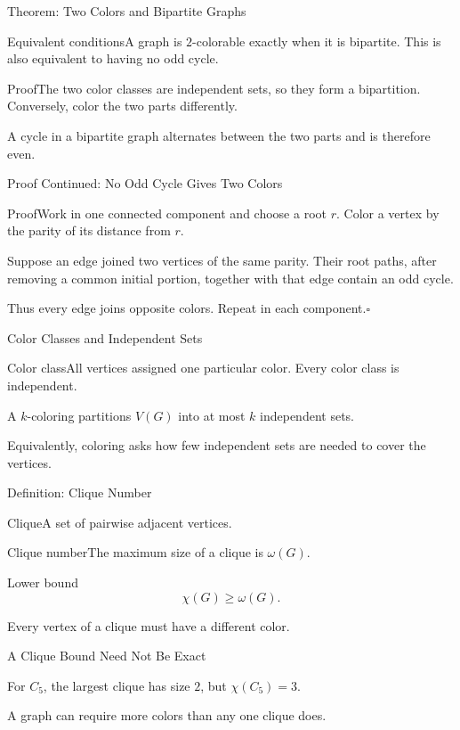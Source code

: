 \documentclass[aspectratio=169,11pt]{beamer}
\newcommand{\Def}[2]{\begin{block}{#1}#2\end{block}}
\newcommand{\Thm}[2]{\begin{block}{#1}#2\end{block}}
\renewcommand{\Proof}[1]{\begin{block}{Proof}\normalsize #1\end{block}}
\newcommand{\gap}{\par\medskip}
\begin{document}
\begin{frame}{Theorem: Two Colors and Bipartite Graphs}
\large
\Thm{Equivalent conditions}{A graph is $2$-colorable exactly when it is bipartite. This is also equivalent to having no odd cycle.}
\Proof{The two color classes are independent sets, so they form a bipartition. Conversely, color the two parts differently.\gap A cycle in a bipartite graph alternates between the two parts and is therefore even.}
\end{frame}
\begin{frame}{Proof Continued: No Odd Cycle Gives Two Colors}
\large
\Proof{Work in one connected component and choose a root $r$. Color a vertex by the parity of its distance from $r$.\gap Suppose an edge joined two vertices of the same parity. Their root paths, after removing a common initial portion, together with that edge contain an odd cycle.\gap Thus every edge joins opposite colors. Repeat in each component.\hfill$\square$}
\end{frame}
\begin{frame}{Color Classes and Independent Sets}
\large
\Def{Color class}{All vertices assigned one particular color. Every color class is independent.}
\gap A $k$-coloring partitions $V(G)$ into at most $k$ independent sets.
\gap Equivalently, coloring asks how few independent sets are needed to cover the vertices.
\end{frame}
\begin{frame}{Definition: Clique Number}
\large
\Def{Clique}{A set of pairwise adjacent vertices.}
\Def{Clique number}{The maximum size of a clique is $\omega(G)$.}
\Thm{Lower bound}{\[\chi(G)\ge\omega(G).\]}
Every vertex of a clique must have a different color.
\end{frame}
\begin{frame}{A Clique Bound Need Not Be Exact}
\large
\begin{center}\end{center}
For $C_5$, the largest clique has size $2$, but $\chi(C_5)=3$.
\gap A graph can require more colors than any one clique does.
\end{frame}
\end{document}
